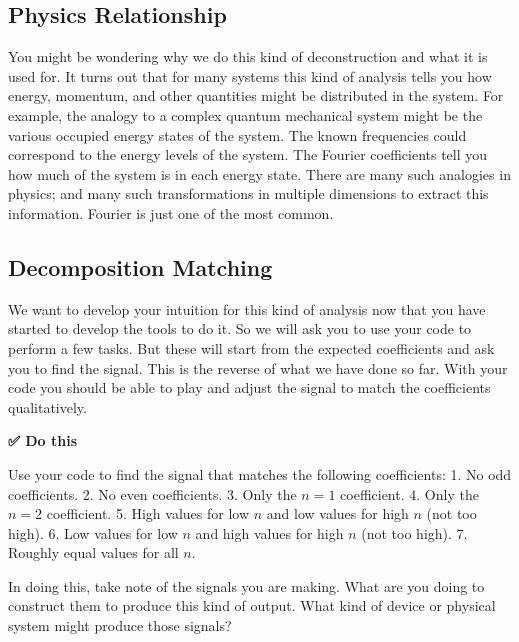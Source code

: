 \subsection{Physics Relationship}\label{physics-relationship}

You might be wondering why we do this kind of deconstruction and what it
is used for. It turns out that for many systems this kind of analysis
tells you how energy, momentum, and other quantities might be
distributed in the system. For example, the analogy to a complex quantum
mechanical system might be the various occupied energy states of the
system. The known frequencies could correspond to the energy levels of
the system. The Fourier coefficients tell you how much of the system is
in each energy state. There are many such analogies in physics; and many
such transformations in multiple dimensions to extract this information.
Fourier is just one of the most common.

\subsection{Decomposition Matching}\label{decomposition-matching}

We want to develop your intuition for this kind of analysis now that you
have started to develop the tools to do it. So we will ask you to use
your code to perform a few tasks. But these will start from the expected
coefficients and ask you to find the signal. This is the reverse of what
we have done so far. With your code you should be able to play and
adjust the signal to match the coefficients qualitatively.

\textbf{✅ Do this}

Use your code to find the signal that matches the following
coefficients: 1. No odd coefficients. 2. No even coefficients. 3. Only
the \(n=1\) coefficient. 4. Only the \(n=2\) coefficient. 5. High values
for low \(n\) and low values for high \(n\) (not too high). 6. Low
values for low \(n\) and high values for high \(n\) (not too high). 7.
Roughly equal values for all \(n\).

In doing this, take note of the signals you are making. What are you
doing to construct them to produce this kind of output. What kind of
device or physical system might produce those signals?

\begin{Shaded}
\begin{Highlighting}[]
\end{Highlighting}
\end{Shaded}

